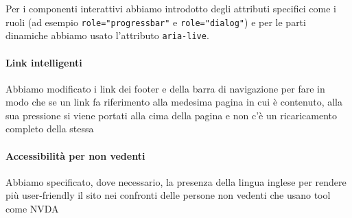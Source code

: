 \documentclass[11pt, a4paper]{article}
\begin{document}
    Per i componenti interattivi abbiamo introdotto degli attributi specifici come i ruoli (ad esempio \texttt{role="progressbar"} e \texttt{role="dialog"}) e per le parti dinamiche abbiamo usato l'attributo \texttt{aria-live}.

    \paragraph{Link intelligenti}
    \par
    Abbiamo modificato i link dei footer e della barra di navigazione per fare in modo che se un link fa riferimento alla medesima pagina in cui è contenuto, alla sua pressione si viene portati alla cima della pagina e non c'è un ricaricamento completo della stessa

    \paragraph{Accessibilità per non vedenti}
    \par
    Abbiamo specificato, dove necessario, la presenza della lingua inglese per rendere più user-friendly il sito nei confronti delle persone non vedenti che usano tool come NVDA
\end{document}
